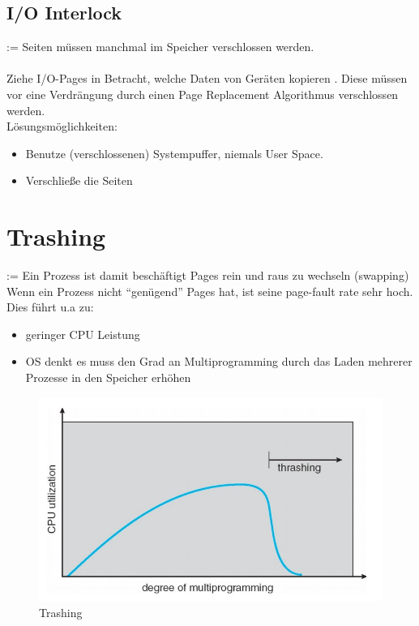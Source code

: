 \documentclass[a4paper]{scrreprt}
\begin{document}
\subsection{I/O Interlock}
:= Seiten müssen manchmal im Speicher verschlossen werden.
\ \\ \\
Ziehe I/O-Pages in Betracht, welche Daten von Geräten kopieren . Diese müssen vor eine Verdrängung durch einen Page Replacement Algorithmus verschlossen werden.\ \\
Lösungsmöglichkeiten:
\begin{itemize}
\item Benutze (verschlossenen) Systempuffer, niemals User Space.
\item Verschließe die Seiten
\end{itemize}

\section{Trashing}
:= Ein Prozess ist damit beschäftigt Pages rein und raus zu wechseln (swapping)
Wenn ein Prozess nicht "`genügend"' Pages hat, ist seine page-fault rate sehr hoch. Dies führt u.a zu:
\begin{itemize}
\item geringer CPU Leistung
\item OS denkt es muss den Grad an Multiprogramming durch das Laden mehrerer Prozesse in den Speicher erhöhen
\end{itemize} 

\begin{figure}[ht]
\centering
\includegraphics[scale=0.5]{graphics/trashing.png}
\caption{Trashing}
\end{figure}
\end{document}
